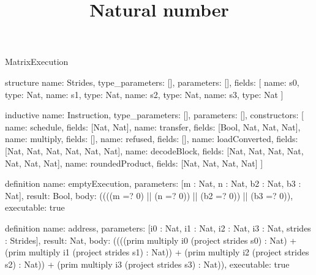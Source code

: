 \begin{lexlean}{MatrixExecution}
\title{Natural number}
\begin{semanticmodule}
structure{
  name: Strides,
  type_parameters: [],
  parameters: [],
  fields: [
    {name: s0, type: Nat},
    {name: s1, type: Nat},
    {name: s2, type: Nat},
    {name: s3, type: Nat}
  ]
}

inductive{
  name: Instruction,
  type_parameters: [],
  parameters: [],
  constructors: [
    {name: schedule, fields: [Nat, Nat]},
    {name: transfer, fields: [Bool, Nat, Nat, Nat]},
    {name: multiply, fields: []},
    {name: refused, fields: []},
    {name: loadConverted, fields: [Nat, Nat, Nat, Nat, Nat, Nat]},
    {name: decodeBlock, fields: [Nat, Nat, Nat, Nat, Nat, Nat, Nat]},
    {name: roundedProduct, fields: [Nat, Nat, Nat, Nat]}
  ]
}

definition{
  name: emptyExecution,
  parameters: [m : Nat, n : Nat, b2 : Nat, b3 : Nat],
  result: Bool,
  body: ((((m =? 0) || (n =? 0)) || (b2 =? 0)) || (b3 =? 0)),
  executable: true
}

definition{
  name: address,
  parameters: [i0 : Nat, i1 : Nat, i2 : Nat, i3 : Nat, strides : Strides],
  result: Nat,
  body: ((((prim multiply i0 (project strides s0) : Nat) + (prim multiply i1 (project strides s1) : Nat)) + (prim multiply i2 (project strides s2) : Nat)) + (prim multiply i3 (project strides s3) : Nat)),
  executable: true
}


\end{semanticmodule}
\end{lexlean}
